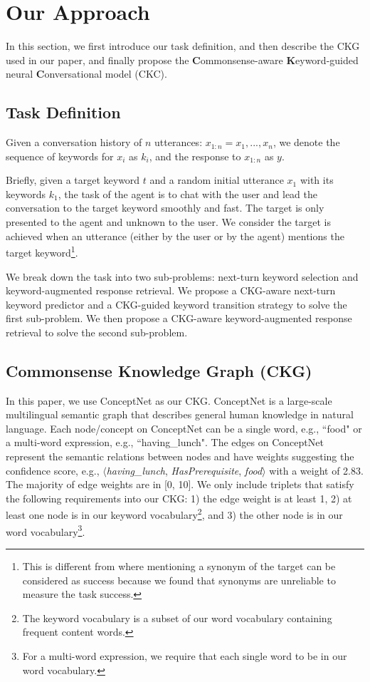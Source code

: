 \documentclass[letterpaper]{article} %
\begin{document}
\section{Our Approach}
\label{sec: our approach}
In this section, we first introduce our task definition, and then describe the CKG used in our paper, and finally propose the \textbf{C}ommonsense-aware \textbf{K}eyword-guided neural \textbf{C}onversational model (CKC).

\subsection{Task Definition}
\label{sec: task definition}
Given a conversation history of $n$ utterances: $x_{1:n} = x_1, ..., x_n$, we denote the sequence of keywords for $x_i$ as $k_i$, and the response to $x_{1:n}$ as $y$.

Briefly, given a target keyword $t$ and a random initial utterance $x_1$ with its keywords $k_1$, the task of the agent is to chat with the user and lead the conversation to the target keyword smoothly and fast. The target is only presented to the agent and unknown to the user. We consider the target is achieved when an utterance (either by the user or by the agent) mentions the target keyword\footnote{This is different from \cite{tang2019target} where mentioning a synonym of the target can be considered as success because we found that synonyms are unreliable to measure the task success.}.

We break down the task into two sub-problems: next-turn keyword selection and keyword-augmented response retrieval. We propose a CKG-aware next-turn keyword predictor and a CKG-guided keyword transition strategy to solve the first sub-problem. We then propose a CKG-aware keyword-augmented response retrieval to solve the second sub-problem.

\subsection{Commonsense Knowledge Graph (CKG)}
\label{sec: ckg}
In this paper, we use ConceptNet \cite{speer2017conceptnet} as our CKG. ConceptNet is a large-scale multilingual semantic graph that describes general human knowledge in natural language. Each node/concept on ConceptNet can be a single word, e.g., ``food" or a multi-word expression, e.g., ``having\_lunch". The edges on ConceptNet represent the semantic relations between nodes and have weights suggesting the confidence score, e.g., $\langle$\textit{having\_lunch}, \textit{HasPrerequisite}, \textit{food}$\rangle$ with a weight of 2.83. The majority of edge weights are in [0, 10]. We only include triplets that satisfy the following requirements into our CKG: 1) the edge weight is at least 1, 2) at least one node is in our keyword vocabulary\footnote{The keyword vocabulary is a subset of our word vocabulary containing frequent content words.}, and 3) the other node is in our word vocabulary\footnote{For a multi-word expression, we require that each single word to be in our word vocabulary.}.
\end{document}
